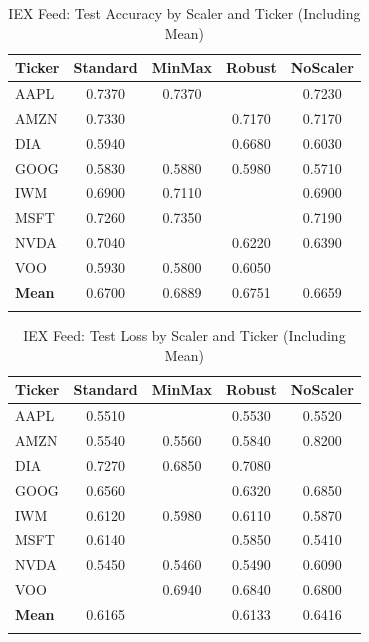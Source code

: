 \documentclass[letterpaper]{article}
\begin{document}
\begin{table}[H]
  \centering
      \caption{IEX Feed: Test Accuracy by Scaler and Ticker (Including Mean)}
  \begin{tabular}{lcccc}
  \toprule
  \textbf{Ticker} & \textbf{Standard} & \textbf{MinMax} & \textbf{Robust} & \textbf{NoScaler} \\
  \midrule
  AAPL  & 0.7370 & 0.7370 & \cellcolor{lightgreen}{0.7380} & 0.7230 \\
  AMZN  & 0.7330 & \cellcolor{lightgreen}{0.7500} & 0.7170 & 0.7170 \\
  DIA   & 0.5940 & \cellcolor{lightgreen}{0.6810} & 0.6680 & 0.6030 \\
  GOOG  & 0.5830 & 0.5880 & \cellcolor{lightgreen!30}0.5980 & 0.5710 \\
  IWM   & 0.6900 & 0.7110 & \cellcolor{lightgreen}{0.7160} & 0.6900 \\
  MSFT  & 0.7260 & 0.7350 & \cellcolor{lightgreen}{0.7370} & 0.7190 \\
  NVDA  & 0.7040 & \cellcolor{lightgreen}{0.7290} & 0.6220 & 0.6390 \\
  VOO   & 0.5930 & 0.5800 & 0.6050 & \cellcolor{lightgreen}{0.5850} \\
  \midrule
  \textbf{Mean} & 0.6700 & 0.6889 & 0.6751 & 0.6659 \\
  \bottomrule
  \label{tab:iex_accuracy}
  \end{tabular}
  \end{table}

\begin{table}[H]
\centering
{}
\caption{IEX Feed: Test Loss by Scaler and Ticker (Including Mean)}
\begin{tabular}{lcccc}
\toprule
\textbf{Ticker} & \textbf{Standard} & \textbf{MinMax} & \textbf{Robust} & \textbf{NoScaler} \\
\midrule
AAPL  & 0.5510 & \cellcolor{lightblue}{0.5430} & 0.5530 & 0.5520 \\
AMZN  & \cellcolor{lightblue}0.5540 & 0.5560 & 0.5840 & 0.8200 \\
DIA   & 0.7270 & 0.6850 & 0.7080 & \cellcolor{lightblue}{0.6590} \\
GOOG  & 0.6560 & \cellcolor{lightblue}{0.5900} & 0.6320 & 0.6850 \\
IWM   & 0.6120 & 0.5980 & 0.6110 &\cellcolor{lightblue} 0.5870 \\
MSFT  & 0.6140 & \cellcolor{lightblue}{0.5360} & 0.5850 & 0.5410 \\
NVDA  & \cellcolor{lightblue}0.5450 & 0.5460 & 0.5490 & 0.6090 \\
VOO   & \cellcolor{lightblue}{0.6730} & 0.6940 & 0.6840 & 0.6800 \\
\midrule
\textbf{Mean} & 0.6165 & \cellcolor{lightblue}{0.5935} & 0.6133 & 0.6416 \\
\bottomrule
\label{tab:iex_loss}
\end{tabular}
\end{table}
\end{document}
